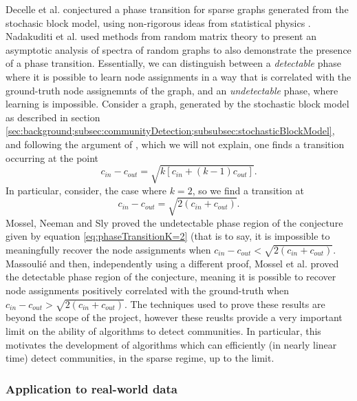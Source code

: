 \documentclass[12pt]{article}
\numberwithin{equation}{section}
\begin{document}
Decelle et al. \cite{DKM+11} conjectured a phase transition for sparse graphs generated from the stochasic block model, using non-rigorous ideas from statistical physics \cite{MNS12}. Nadakuditi et al. \cite{NN12} used methods from random matrix theory to present an asymptotic analysis of spectra of random graphs to also demonstrate the presence of a phase transition. Essentially, we can distinguish between a \textit{detectable} phase where it is possible to learn node assignments in a way that is correlated with the ground-truth node assignemnts of the graph, and an \textit{undetectable} phase, where learning is impossible. Consider a graph, generated by the stochastic block model as described in section \ref{sec:background;subsec:communityDetection;subsubsec:stochasticBlockModel}, and following the argument of \cite{NN12}, which we will not explain, one finds a transition occurring at the point
\begin{equation}
\label{eq:phaseTransitionK}
	c_{in} - c_{out} = \sqrt{k[c_{in} + (k-1)c_{out}]}.
\end{equation}
In particular, consider, the case where $k = 2$, so we find a transition at
\begin{equation}
\label{eq:phaseTransitionK=2}
	c_{in} - c_{out} = \sqrt{2(c_{in} + c_{out})}.
\end{equation}
Mossel, Neeman and Sly \cite{MNS12} proved the undetectable phase region of the conjecture given by equation \ref{eq:phaseTransitionK=2} (that is to say, it is impossible to meaningfully recover the node assignments when $ c_{in} - c_{out} < \sqrt{2(c_{in} + c_{out})}$. Massouli\'e \cite{Mas13} and then, independently using a different proof, Mossel et al. \cite{MNS13b} proved the detectable phase region of the conjecture, meaning it is possible to recover node assignments positively correlated with the ground-truth when $ c_{in} - c_{out} > \sqrt{2(c_{in} + c_{out})}$. The techniques used to prove these results are beyond the scope of the project, however these reuslts provide a very important limit on the ability of algorithms to detect communities. In particular, this motivates the development of algorithms which can efficiently (in nearly linear time) detect communities, in the sparse regime, up to the limit.

\subsubsection{Application to real-world data}
\label{sec:background;subsec:communityDetection;subsubsec:applicationToRealWorldData}
\end{document}
